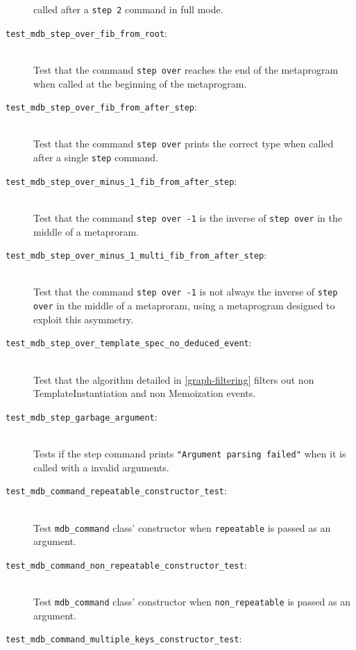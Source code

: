 \begin{description}
        called after a \texttt{step 2} command in full mode.
    \item[\texttt{test\_mdb\_step\_over\_fib\_from\_root}:] \hfill \\
        Test that the command \texttt{step over} reaches the end of the
        metaprogram when called at the beginning of the metaprogram.
    \item[\texttt{test\_mdb\_step\_over\_fib\_from\_after\_step}:] \hfill \\
        Test that the command \texttt{step over} prints the correct type when
        called after a single \texttt{step} command.
    \item[\texttt{test\_mdb\_step\_over\_minus\_1\_fib\_from\_after\_step}:] \hfill \\
        Test that the command \texttt{step over -1} is the inverse of
        \texttt{step over} in the middle of a metaproram.
    \item[\texttt{test\_mdb\_step\_over\_minus\_1\_multi\_fib\_from\_after\_step}:] \hfill \\
        Test that the command \texttt{step over -1} is not always the inverse
        of \texttt{step over} in the middle of a metaproram, using a
        metaprogram designed to exploit this asymmetry.
    \item[\texttt{test\_mdb\_step\_over\_template\_spec\_no\_deduced\_event}:] \hfill \\
        Test that the algorithm detailed in \ref{graph-filtering} filters out
        non TemplateInstantiation and non Memoization events.
    \item[\texttt{test\_mdb\_step\_garbage\_argument}:] \hfill \\
        Tests if the step command prints
        \texttt{"Argument parsing failed"} when it is called with a invalid
        arguments.
    \item[\texttt{test\_mdb\_command\_repeatable\_constructor\_test}:] \hfill \\
        Test \texttt{mdb\_command} class' constructor when \texttt{repeatable}
        is passed as an argument.
    \item[\texttt{test\_mdb\_command\_non\_repeatable\_constructor\_test}:] \hfill \\
        Test \texttt{mdb\_command} class' constructor when
        \texttt{non\_repeatable} is passed as an argument.
    \item[\texttt{test\_mdb\_command\_multiple\_keys\_constructor\_test}:] \hfill \\

\end{description}
